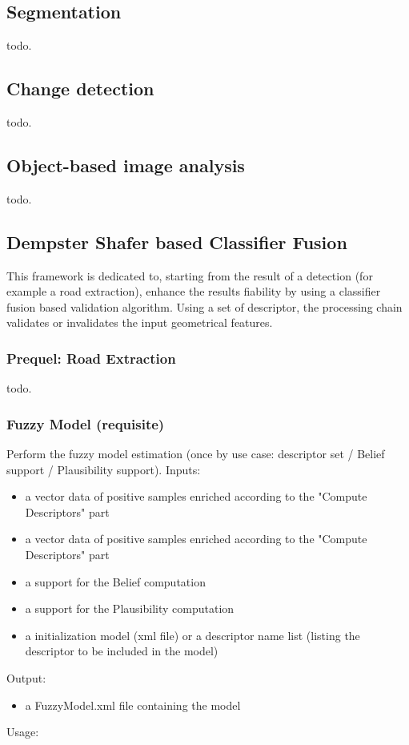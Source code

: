 \subsection{Segmentation}\label{ssec:segmentation}

todo.

\subsection{Change detection}\label{ssec:changedetection}

todo.

\subsection{Object-based image analysis}\label{ssec:obia}

todo.

\subsection{Dempster Shafer based Classifier Fusion}\label{ssec:classifierfusion}

This framework is dedicated to, starting from the result of a detection (for example a road extraction), enhance the results fiability by using a classifier fusion based validation algorithm. Using a set of descriptor, the processing chain validates or invalidates the input geometrical features.

\subsubsection{Prequel: Road Extraction}

todo.

\subsubsection{Fuzzy Model (requisite)}

Perform the fuzzy model estimation (once by use case: descriptor set / Belief support / Plausibility support).
Inputs:
\begin{itemize}
\item a vector data of positive samples enriched according to the "Compute Descriptors" part
\item a vector data of positive samples enriched according to the "Compute Descriptors" part
\item a support for the Belief computation
\item a support for the Plausibility computation
\item a initialization model (xml file) or a descriptor name list (listing the descriptor to be included in the model)
\end{itemize}
Output:
\begin{itemize}
\item a FuzzyModel.xml file containing the model
\end{itemize}
Usage:

